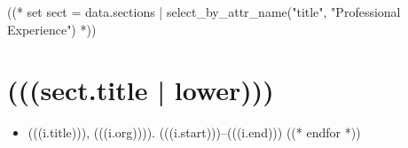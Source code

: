 \documentclass[11pt,article,oneside]{memoir}
\begin{document}
((* set sect = data.sections | select_by_attr_name("title", "Professional Experience") *))
\section{(((sect.title | lower)))}

\mbox{}\vspace{-\dimexpr\baselineskip\relax}

\begin{itemize}[label={}]
((* for i in sect.entries.experience | sort_by_attr(["end", "start"], reverse=True) *))
\item (((i.title))), (((i.org)))). (((i.start)))--(((i.end)))
((* endfor *))
\end{itemize}
\end{document}
